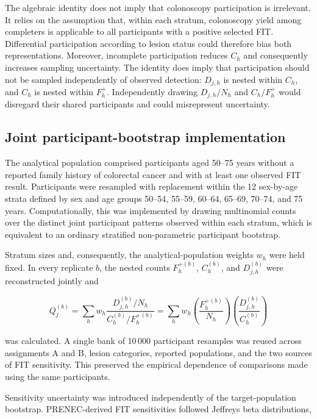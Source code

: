\documentclass[10pt,a4paper]{article}
\begin{document}
The algebraic identity does not imply that colonoscopy participation is
irrelevant. It relies on the assumption that, within each stratum,
colonoscopy yield among completers is applicable to all participants with a
positive selected FIT. Differential participation according to lesion status
could therefore bias both representations. Moreover, incomplete participation
reduces $C_h$ and consequently increases sampling uncertainty. The identity
does imply that participation should not be sampled independently of observed
detection: $D_{j,h}$ is nested within $C_h$, and $C_h$ is nested within
$F_h^+$. Independently drawing $D_{j,h}/N_h$ and $C_h/F_h^+$ would disregard
their shared participants and could misrepresent uncertainty.

\subsection*{Joint participant-bootstrap implementation}

The analytical population comprised participants aged 50--75 years without a
reported family history of colorectal cancer and with at least one observed
FIT result. Participants were resampled with replacement within the 12
sex-by-age strata defined by sex and age groups 50--54, 55--59, 60--64,
65--69, 70--74, and 75 years. Computationally, this was implemented by drawing
multinomial counts over the distinct joint participant patterns observed
within each stratum, which is equivalent to an ordinary stratified
non-parametric participant bootstrap.

Stratum sizes and, consequently, the analytical-population weights $w_h$ were
held fixed. In every replicate $b$, the nested counts
$F_h^{+(b)}$, $C_h^{(b)}$, and $D_{j,h}^{(b)}$ were reconstructed jointly and

\begin{equation*}
Q_j^{(b)}
=
\sum_h w_h
\frac{D_{j,h}^{(b)}/N_h}
     {C_h^{(b)}/F_h^{+(b)}}
=
\sum_h w_h
\left(\frac{F_h^{+(b)}}{N_h}\right)
\left(\frac{D_{j,h}^{(b)}}{C_h^{(b)}}\right)
\end{equation*}

was calculated. A single bank of 10\,000 participant resamples was reused
across assignments A and B, lesion categories, reported populations, and the
two sources of FIT sensitivity. This preserved the empirical dependence of comparisons
made using the same participants.

Sensitivity uncertainty was introduced independently of the target-population
bootstrap. PRENEC-derived FIT sensitivities followed Jeffreys beta
distributions,
\end{document}
